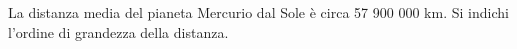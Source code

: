 La distanza media del pianeta Mercurio dal Sole è circa 57 900 000 km. 
Si indichi l'ordine di grandezza della distanza.